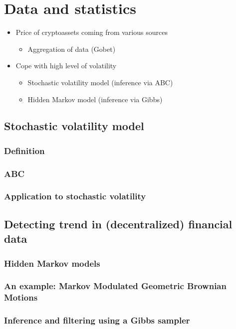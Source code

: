 \section{Data and statistics}
\begin{itemize}
\item Price of cryptoassets coming from various sources
\begin{itemize}
\item Aggregation of data (Gobet)
\end{itemize}
\item Cope with high level of volatility
\begin{itemize}
  \item Stochastic volatility model (inference via ABC)
  \item Hidden Markov model (inference via Gibbs)
\end{itemize}
\end{itemize}
\subsection{Stochastic volatility model}
\subsubsection{Definition}
\subsubsection{ABC}
\subsubsection{Application to stochastic volatility}
\subsection{Detecting trend in (decentralized) financial data}
\subsubsection{Hidden Markov models}
\subsubsection{An example: Markov Modulated Geometric Brownian Motions}
\subsubsection{Inference and filtering using a Gibbs sampler}